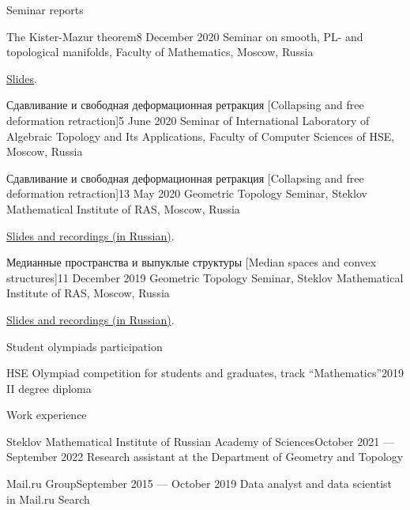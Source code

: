 \documentclass{resume}
\begin{document}
\begin{rSection}{Seminar reports}
  \begin{rSubsection}{The Kister-Mazur theorem}{8 December 2020}{}
    Seminar on smooth, PL- and topological manifolds, Faculty of Mathematics, Moscow, Russia
    \vspace{0.5em}

    \href{https://drive.google.com/file/d/1WE5F7Bgqm7x6pB6irsLrthQtfk3Psl7e/view}{Slides}.
  \end{rSubsection}

  \begin{rSubsection}{Сдавливание и свободная деформационная ретракция [Collapsing and free
      deformation retraction]}{5 June 2020}{}
    Seminar of International Laboratory of Algebraic Topology and Its Applications, Faculty of
    Computer Sciences of HSE, Moscow, Russia
  \end{rSubsection}

  \begin{rSubsection}{Сдавливание и свободная деформационная ретракция [Collapsing and free deformation retraction]}{13 May 2020}{}
    Geometric Topology Seminar, Steklov Mathematical Institute of RAS, Moscow, Russia
    \vspace{0.5em}

    \href{http://www.mathnet.ru/php/seminars.phtml?option_lang=eng&presentid=27125}{Slides and recordings (in Russian)}.
  \end{rSubsection}

  \begin{rSubsection}{Медианные пространства и выпуклые структуры [Median spaces and convex structures]}{11 December 2019}{}
    Geometric Topology Seminar, Steklov Mathematical Institute of RAS, Moscow, Russia
    \vspace{0.5em}

    \href{http://www.mathnet.ru/php/seminars.phtml?option_lang=eng&presentid=26027}{Slides and recordings (in Russian)}.
  \end{rSubsection}
\end{rSection}

\begin{rSection}{Student olympiads participation}
  \begin{rSubsection}{HSE Olympiad competition for students and graduates, track ``Mathematics''}{2019}{}
    II degree diploma
  \end{rSubsection}
\end{rSection}

\begin{rSection}{Work experience}
  \begin{rSubsection}{Steklov Mathematical Institute of Russian Academy of Sciences}{October 2021 --- September 2022}{}
    Research assistant at the Department of Geometry and Topology
  \end{rSubsection}

  \begin{rSubsection}{Mail.ru Group}{September 2015 --- October 2019}{}
    Data analyst and data scientist in Mail.ru Search
  \end{rSubsection}
\end{rSection}
\end{document}
